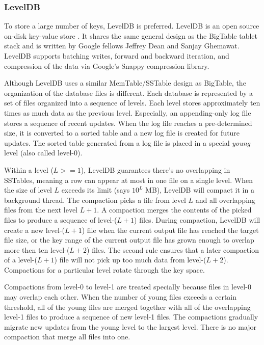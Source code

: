 \documentclass[11pt]{book}
\begin{document}
\subsubsection{LevelDB}
To store a large number of keys, LevelDB is preferred. LevelDB is an open source on-disk key-value store \cite{LevelDB}. It shares the same general design as the BigTable tablet stack and is written by Google fellows Jeffrey Dean and Sanjay Ghemawat. LevelDB supports batching writes, forward and backward iteration, and compression of the data via Google's Snappy compression library.

Although LevelDB uses a similar MemTable/SSTable design as BigTable, the organization of the database files is different. Each database is represented by a set of files organized into a sequence of levels. Each level stores approximately ten times as much data as the previous level. Especially, an appending-only log file stores a sequence of recent updates. When the log file reaches a pre-determined size, it is converted to a sorted table and a new log file is created for future updates. The sorted table generated from a log file is placed in a special {\em young} level (also called level-0).

Within a level ($L > =1$), LevelDB guarantees there's no overlapping in SSTables, meaning a row can appear at most in one file on a single level. When the size of level $L$ exceeds its limit (says $10^L$ MB), LevelDB will compact it in a background thread. The compaction picks a file from level $L$ and all overlapping files from the next level $L+1$. A compaction merges the contents of the picked files to produce a sequence of level-($L+1$) files. During compaction, LevelDB will create a new level-($L+1$) file when the current output file has reached the target file size, or the key range of the current output file has grown enough to overlap more then ten level-($L+2$) files. The second rule ensures that a later compaction of a level-($L+1$) file will not pick up too much data from level-($L+2$). Compactions for a particular level rotate through the key space. 

Compactions from level-0 to level-1 are treated specially because files in level-0 may overlap each other. When the number of young files exceeds a certain threshold, all of the young files are merged together with all of the overlapping level-1 files to produce a sequence of new level-1 files. The compactions gradually migrate new updates from the young level to the largest level. There is no major compaction that merge all files into one.
\end{document}
